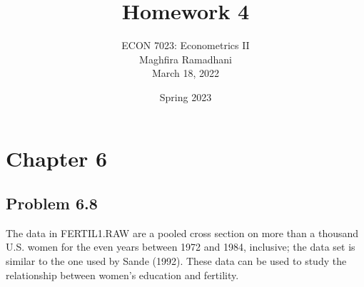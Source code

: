 \documentclass[10pt]{article}
\begin{document}
 
\title{Homework 4}
\author{ECON 7023: Econometrics II\\
Maghfira Ramadhani\\
March 18, 2022}
\date{Spring 2023}
\maketitle

\section*{Chapter 6}
\subsection*{Problem 6.8}
The data in FERTIL1.RAW are a pooled cross section on more than a thousand U.S. women for the even years between 1972 and 1984, inclusive; the data set is similar to the one used by Sande (1992). These data can be used to study the relationship between women's education and fertility.
\end{document}
